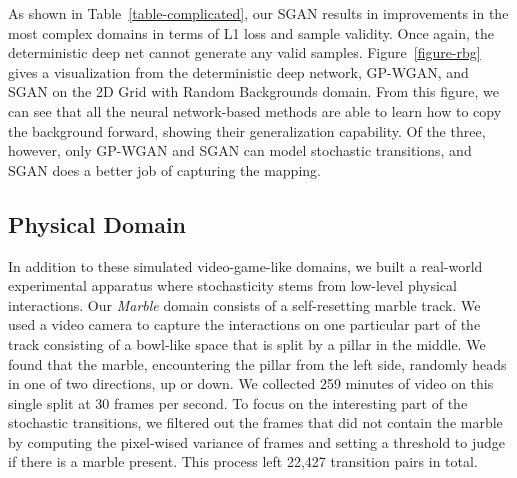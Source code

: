 \documentclass[letterpaper]{article} %
\begin{document}
As shown in Table~\ref{table-complicated}, our SGAN results in improvements in the most complex domains in terms of L1 loss and sample validity. 
Once again, the deterministic deep net cannot generate any valid samples. Figure~\ref{figure-rbg} gives a visualization from the deterministic deep network, GP-WGAN, and SGAN on the 2D Grid with Random Backgrounds domain. From this figure, we can see that all the neural network-based methods are able to learn how to copy the background forward, showing their generalization capability. Of the three, however, only GP-WGAN and SGAN can model stochastic transitions, and SGAN does a better job of capturing the mapping.

\subsection{Physical Domain}

In addition to these simulated video-game-like domains, we built a real-world experimental apparatus where stochasticity stems from low-level physical interactions. Our \emph{Marble} domain consists of a self-resetting marble track. We used a video camera to capture the interactions on one particular part of the track consisting of a bowl-like space that is split by a pillar in the middle. We found that the marble, encountering the pillar from the left side, randomly heads in one of two directions, up or down. We collected 259 minutes of video on this single split at 30 frames per second. To focus on the interesting part of the stochastic transitions, we filtered out the frames that did not contain the marble by computing the pixel-wised variance of frames and setting a threshold to judge if there is a marble present. This process left 22,427 transition pairs in total.
\end{document}
